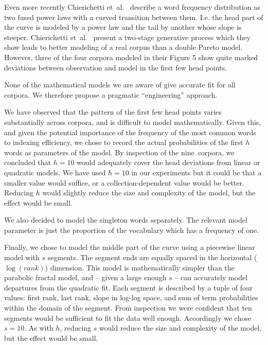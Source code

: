 \documentclass[11pt]{report}
\newcommand{\etal}{et~al.}
\newcommand{\numcolls}{nine}
\begin{document}
Even more recently Chierichetti \etal~\cite{ChierichettiKP2017}
describe a word frequency distribution as two fused power laws with a
curved transition between them.  I.e. the head part of the curve is
modeled by a power law and the tail by another whose slope is
steeper.  Chierichetti \etal~ present a two-stage generative process
which they show leads to better modeling of a real corpus than a
double Pareto model.   However, three of the four corpora modeled in
their Figure 5 show quite marked deviations between observation and
model in the first few head points.

None of the mathematical models we are aware of give accurate fit for
all corpora.  We therefore propose a pragmatic ``engineering'' approach.

We have observed that the pattern of the first few
head points varies substantially across corpora, and is difficult to
model mathematically. Given this, and given
the potential importance of the frequency of the most common words to
indexing efficiency, we chose to record the actual probabilities of
the first $h$ words as parameters of the model.  By inspection of the
\numcolls~corpora, we concluded that $h=10$ would adequately cover the
head deviations from linear or quadratic models.  We have used $h=10$ in our
experiments but it could be that a smaller value would suffice, or 
a collection-dependent value would be better.  Reducing $h$ would slightly
reduce the size and complexity of the model, but the effect would be small.

We also decided to model the singleton words separately.  The relevant 
model parameter is just the proportion of the vocabulary which has
a frequency of one.  

Finally, we chose to model the middle part of the curve using a
piecewise linear model with $s$ segments.  The segment ends are
equally spaced in the horizontal ($\log(\mathit{rank})$) dimension.
This model is mathematically simpler than the parabolic fractal model,
and -- given a large enough $s$ -- can accurately model departures from the
quadratic fit.  Each segment is described by a tuple of four values:
first rank, last rank, slope in log-log space, and sum of term
probabilities within the domain of the segment.  From inspection
we were confident that ten segments would be sufficient to fit the
data well enough.  Accordingly we chose $s=10$.  As with $h$,  
reducing $s$ would reduce the size and complexity of the model, 
but the effect would be small.
\end{document}
